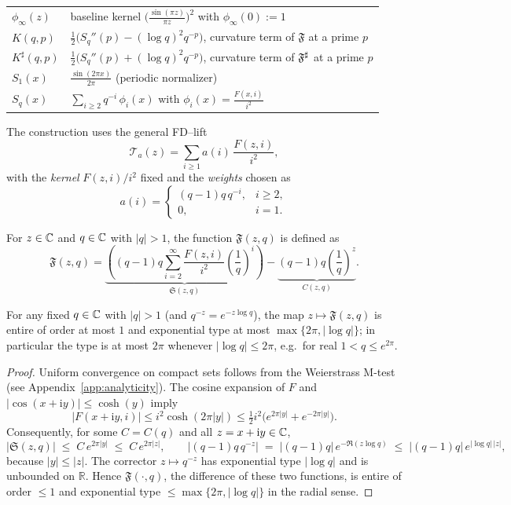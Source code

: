 \begin{center}
\begin{tabular}{ll}
$\phi_\infty(z)$ & baseline kernel $\bigl(\frac{\sin(\pi z)}{\pi z}\bigr)^2$ with $\phi_\infty(0):=1$ \\[2pt]
$K(q,p)$ & $\tfrac12\big(S_q''(p)-(\log q)^2 q^{-p}\big)$, curvature term of $\mathfrak F$ at a prime $p$ \\[2pt]
$K^\sharp(q,p)$ & $\tfrac12\big(S_q''(p)+(\log q)^2 q^{-p}\big)$, curvature term of $\mathfrak F^{\sharp}$ at a prime $p$ \\[2pt]
$S_1(x)$ & $\displaystyle \frac{\sin(2\pi x)}{2\pi}$ (periodic normalizer) \\[2pt]
$S_q(x)$ & $\displaystyle \sum_{i\ge2} q^{-i}\,\phi_i(x)$ with $\phi_i(x)=\frac{F(x,i)}{i^2}$
\end{tabular}
\end{center}
\medskip

The construction uses the general FD--lift
\[
\mathcal T_a(z)=\sum_{i\ge1} a(i)\,\frac{F(z,i)}{i^2},
\]
with the \emph{kernel} $F(z,i)/i^2$ fixed and the \emph{weights} chosen as
\[
a(i)=\begin{cases}
(q-1)q\,q^{-i}, & i\ge 2,\\
0, & i=1.
\end{cases}
\]

\begin{definition}
For $z \in \mathbb{C}$ and $q \in \mathbb{C}$ with $|q|>1$, the function $\mathfrak{F}(z,q)$ is defined as
\[\mathfrak{F}(z,q) = \underbrace{\left( (q-1)q \sum_{i=2}^{\infty} \frac{F(z,i)}{i^2} \left(\frac{1}{q}\right)^i \right)}_{\mathfrak{S}(z,q)} - \underbrace{(q-1)q \left(\frac{1}{q}\right)^z}_{C(z,q)}.\]
\end{definition}

\begin{theorem}\label{thm:analyticity-growth}
For any fixed $q\in\mathbb{C}$ with $|q|>1$ (and $q^{-z}=e^{-z\log q}$), the map $z \mapsto \mathfrak{F}(z,q)$ is entire of order at most $1$ and exponential type at most $\max\{2\pi,|\log q|\}$; in particular the type is at most $2\pi$ whenever $|\log q|\le2\pi$, e.g.\ for real $1<q\le e^{2\pi}$.
\end{theorem}
\begin{proof}
Uniform convergence on compact sets follows from the Weierstrass M-test (see Appendix~\ref{app:analyticity}). The cosine expansion of $F$ and $|\cos(x+\mathrm{i}y)|\le\cosh(y)$ imply
\[
|F(x+\mathrm{i}y,i)|\le i^2\cosh(2\pi|y|)\le \tfrac12 i^2\big(e^{2\pi|y|}+e^{-2\pi|y|}\big).
\]
Consequently, for some $C=C(q)$ and all $z=x+\mathrm{i}y\in\mathbb{C}$,
\[
|\mathfrak S(z,q)|\;\le\; C\,e^{2\pi|y|}\;\le\; C\,e^{2\pi|z|},
\qquad
\bigl|(q-1)q\,q^{-z}\bigr|\;=\;|(q-1)q|\,e^{-\Re(z\log q)}\;\le\;|(q-1)q|\,e^{|\log q|\,|z|},
\]
because $|y|\le |z|$. The corrector $z\mapsto q^{-z}$ has exponential type $|\log q|$ and is unbounded on $\mathbb R$. Hence $\mathfrak F(\cdot,q)$, the difference of these two functions, is entire of order $\le 1$ and exponential type $\le \max\{2\pi,|\log q|\}$ in the radial sense.
\end{proof}

